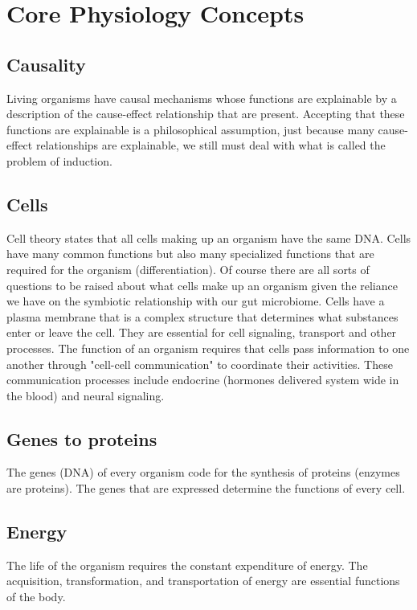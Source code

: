 \section{Core Physiology Concepts}

\subsection{Causality}
Living organisms have causal mechanisms whose functions are explainable by a description of the cause-effect relationship that are present. Accepting that these functions are explainable is a philosophical assumption, just because many cause-effect relationships are explainable, we still must deal with what is called the problem of induction.

\subsection{Cells}
Cell theory states that all cells making up an organism have the same DNA. Cells have many common functions but also many specialized functions that are required for the organism (differentiation). Of course there are all sorts of questions to be raised about what cells make up an organism given the reliance we have on the symbiotic relationship with our gut microbiome. Cells have a plasma membrane that is a complex structure that determines what substances enter or leave the cell. They are essential for cell signaling, transport and other processes. The function of an organism requires that cells pass information to one another through "cell-cell communication" to coordinate their activities. These communication processes include endocrine (hormones delivered system wide in the blood) and neural signaling. 

\subsection{Genes to proteins}
The genes (DNA) of every organism code for the synthesis of proteins (enzymes are proteins). The genes that are expressed determine the functions of every cell.

\subsection{Energy}
The life of the organism requires the constant expenditure of energy. The acquisition, transformation, and transportation of energy are essential functions of the body.


